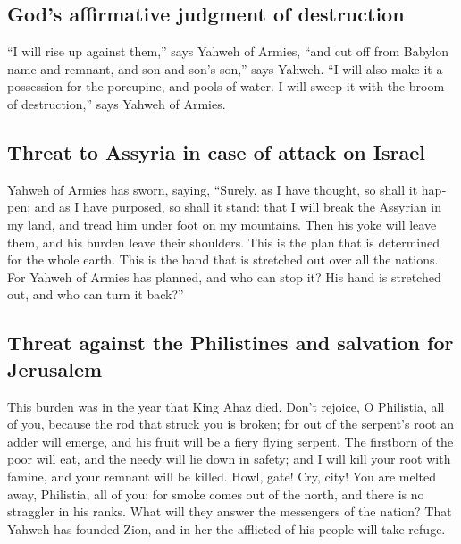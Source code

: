 \begin{paracol}{2}
\begin{otherlanguage}{english}
\hypertarget{gods-affirmative-judgment-of-destruction}{%
\subsection{God's affirmative judgment of
destruction}\label{gods-affirmative-judgment-of-destruction}}

 ``I will rise up against them,'' says Yahweh of Armies,
``and cut off from Babylon name and remnant, and son and son's son,''
says Yahweh.  ``I will also make it a possession for the
porcupine, and pools of water. I will sweep it with the broom of
destruction,'' says Yahweh of Armies.

\hypertarget{threat-to-assyria-in-case-of-attack-on-israel}{%
\subsection{Threat to Assyria in case of attack on
Israel}\label{threat-to-assyria-in-case-of-attack-on-israel}}

 Yahweh of Armies has sworn, saying, ``Surely, as I have
thought, so shall it happen; and as I have purposed, so shall it stand:
 that I will break the Assyrian in my land, and tread him
under foot on my mountains. Then his yoke will leave them, and his
burden leave their shoulders.  This is the plan that is
determined for the whole earth. This is the hand that is stretched out
over all the nations.  For Yahweh of Armies has planned,
and who can stop it? His hand is stretched out, and who can turn it
back?''

\hypertarget{threat-against-the-philistines-and-salvation-for-jerusalem}{%
\subsection{Threat against the Philistines and salvation for
Jerusalem}\label{threat-against-the-philistines-and-salvation-for-jerusalem}}

 This burden was in the year that King Ahaz died.
 Don't rejoice, O Philistia, all of you, because the rod
that struck you is broken; for out of the serpent's root an adder will
emerge, and his fruit will be a fiery flying serpent. 
The firstborn of the poor will eat, and the needy will lie down in
safety; and I will kill your root with famine, and your remnant will be
killed.  Howl, gate! Cry, city! You are melted away,
Philistia, all of you; for smoke comes out of the north, and there is no
straggler in his ranks.  What will they answer the
messengers of the nation? That Yahweh has founded Zion, and in her the
afflicted of his people will take refuge.


\end{otherlanguage}
\end{paracol}
